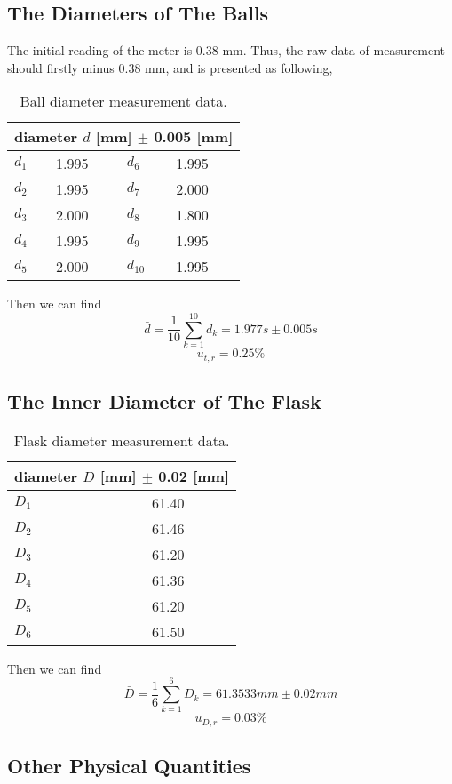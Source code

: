 \subsection{The Diameters of The Balls}

The initial reading of the meter is 0.38 mm.
Thus, the raw data of measurement should firstly minus 0.38 mm, and is presented
as following, 

\begin{table}[H]
  \centering
  \begin{tabular}{|p{2cm}|p{3cm}||p{2cm} |p{3cm} |}
    \hline
    \multicolumn{4}{|c|}{diameter $d$ [mm] $\pm$ 0.005 [mm]  } \\
    \hline
    $d_1$ & 1.995 & $d_6$ & 1.995 \\ \hline
    $d_2$ & 1.995 & $d_7$ & 2.000 \\ \hline
    $d_3$ & 2.000 & $d_8$ & 1.800 \\ \hline
    $d_4$ & 1.995 & $d_9$ & 1.995 \\ \hline
    $d_5$ & 2.000 & $d_{10}$ & 1.995 \\ \hline
  \end{tabular}
  \caption{Ball diameter measurement data.}
\end{table}

Then we can find
$$  \bar{d} = \frac{1}{10} \sum_{k=1}^{10} d_k = 1.977  s \pm  0.005 s   $$
$$  u_{t,r} =  0.25 \%  $$ 

\subsection{The Inner Diameter of The Flask}

\begin{table}[H]
  \centering
  \begin{tabular}{|p{1cm}|c|}
    \hline
    \multicolumn{2}{|c|}{diameter $D$ [mm] $\pm$ 0.02 [mm]  } \\
    \hline
    $D_1$ & 61.40 \\ \hline
    $D_2$ & 61.46 \\ \hline
    $D_3$ & 61.20 \\ \hline
    $D_4$ & 61.36 \\ \hline
    $D_5$ & 61.20 \\ \hline
    $D_6$ & 61.50 \\ \hline
  \end{tabular}
  \caption{Flask diameter measurement data.}
\end{table}


Then we can find
$$  \bar{D} = \frac{1}{6} \sum_{k=1}^{6} D_k =  61.3533 mm \pm  0.02 mm   $$
$$  u_{D,r} =   0.03\%  $$ 


\subsection{Other Physical Quantities}

